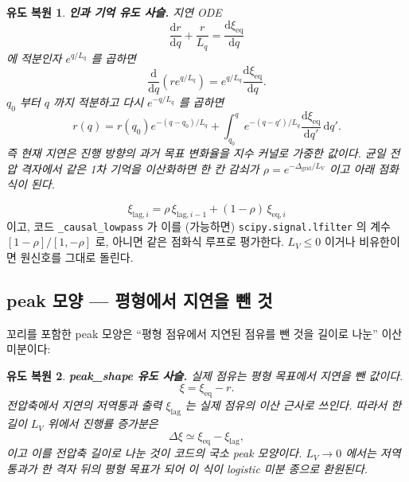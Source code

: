 \documentclass[11pt,a4paper]{article}
\newtheorem*{derivebox}{유도 복원}
\newcommand{\dd}{\mathrm{d}}
\newcommand{\eq}{\mathrm{eq}}
\newcommand{\code}[1]{\texttt{#1}}
\begin{document}
\begin{derivebox}
\textbf{인과 기억 유도 사슬.} 지연 ODE
\begin{equation*}
\frac{\dd r}{\dd q}+\frac{r}{L_q}=\frac{\dd\xi_{\eq}}{\dd q}
\end{equation*}
에 적분인자 $e^{q/L_q}$ 를 곱하면
\begin{equation*}
\frac{\dd}{\dd q}\left(r e^{q/L_q}\right)=e^{q/L_q}\frac{\dd\xi_{\eq}}{\dd q}.
\end{equation*}
$q_0$ 부터 $q$ 까지 적분하고 다시 $e^{-q/L_q}$ 를 곱하면
\begin{equation*}
r(q)=r(q_0)e^{-(q-q_0)/L_q}+\int_{q_0}^{q}e^{-(q-q')/L_q}\frac{\dd\xi_{\eq}}{\dd q'}\,\dd q'.
\end{equation*}
즉 현재 지연은 진행 방향의 과거 목표 변화율을 지수 커널로 가중한 값이다. 균일 전압 격자에서 같은 1차 기억을 이산화하면 한 칸 감쇠가 $\rho=e^{-\Delta_{\mathrm{grid}}/L_V}$ 이고 아래 점화식이 된다.
\end{derivebox}

\begin{equation}
\xi_{\mathrm{lag},i}=\rho\,\xi_{\mathrm{lag},i-1}+(1-\rho)\,\xi_{\eq,i}
\label{eq:lowpass}
\end{equation}
이고, 코드 \code{\_causal\_lowpass} 가 이를 (가능하면) \code{scipy.signal.lfilter} 의 계수
$[1-\rho]/[1,-\rho]$ 로, 아니면 같은 점화식 루프로 평가한다. $L_V\le0$ 이거나 비유한이면 원신호를 그대로 돌린다.

\subsection{peak 모양 — 평형에서 지연을 뺀 것}
꼬리를 포함한 peak 모양은 ``평형 점유에서 지연된 점유를 뺀 것을 길이로 나눈'' 이산 미분이다:

\begin{derivebox}
\textbf{peak\_shape 유도 사슬.} 실제 점유는 평형 목표에서 지연을 뺀 값이다.
\begin{equation*}
\xi=\xi_{\eq}-r.
\end{equation*}
전압축에서 지연의 저역통과 출력 $\xi_{\mathrm{lag}}$ 는 실제 점유의 이산 근사로 쓰인다. 따라서 한 길이 $L_V$ 위에서 진행률 증가분은
\begin{equation*}
\Delta\xi\simeq\xi_{\eq}-\xi_{\mathrm{lag}},
\end{equation*}
이고 이를 전압축 길이로 나눈 것이 코드의 국소 peak 모양이다. $L_V\to0$ 에서는 저역통과가 한 격자 뒤의 평형 목표가 되어 이 식이 logistic 미분 종으로 환원된다.
\end{derivebox}
\end{document}
